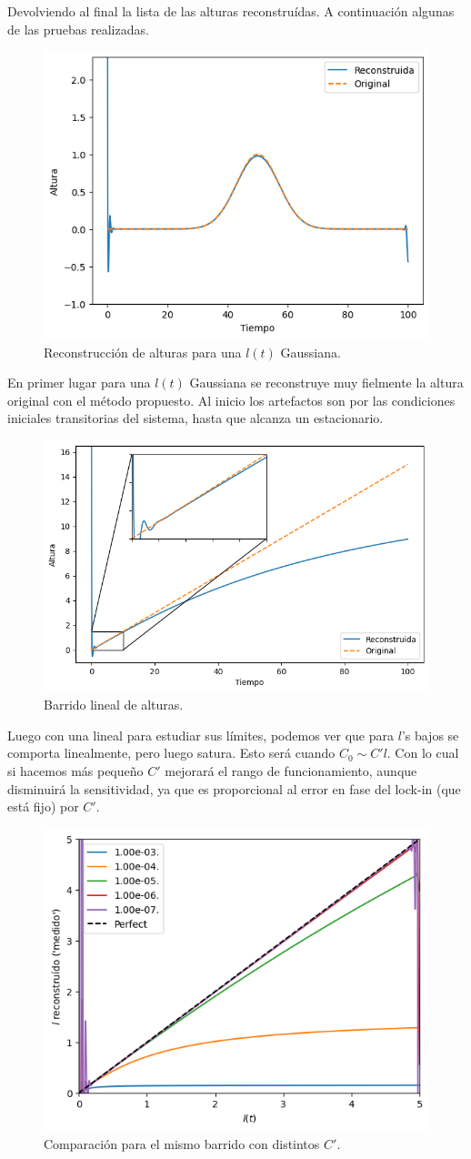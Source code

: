 Devolviendo al final la lista de las alturas reconstruídas. A continuación algunas de las pruebas realizadas.


\begin{figure}[!ht]
	\centering
	\includegraphics[width=0.45167\linewidth]{Figures/31_04_2025/Altura_gaussiana}
	\caption{Reconstrucción de alturas para una $l(t)$ Gaussiana.}
	\label{fig:alturagaussiana}
\end{figure}

En primer lugar para una $l(t)$ Gaussiana se reconstruye muy fielmente la altura original con el método propuesto. Al inicio los artefactos son por las condiciones iniciales transitorias del sistema, hasta que alcanza un estacionario.

\begin{figure}[!ht]
	\centering
	\includegraphics[width=0.45167\linewidth]{Figures/31_04_2025/Altura_lineal}
	\caption{Barrido lineal de alturas.}
	\label{fig:alturalineal}
\end{figure}


Luego con una lineal para estudiar sus límites, podemos ver que para $l$'s bajos se comporta linealmente, pero luego satura. Esto será cuando $C_0 \sim C'l$. Con lo cual si hacemos más pequeño $C'$ mejorará el rango de funcionamiento, aunque disminuirá la sensitividad, ya que es proporcional al error en fase del lock-in (que está fijo) por $C'$.

\begin{figure}[!ht]
	\centering
	\includegraphics[width=0.4516\linewidth]{Figures/31_04_2025/Altura_lineal_varios_Cp}
	\caption{Comparación para el mismo barrido con distintos $C'$.}
	\label{fig:alturalinealvarioscp}
\end{figure}


